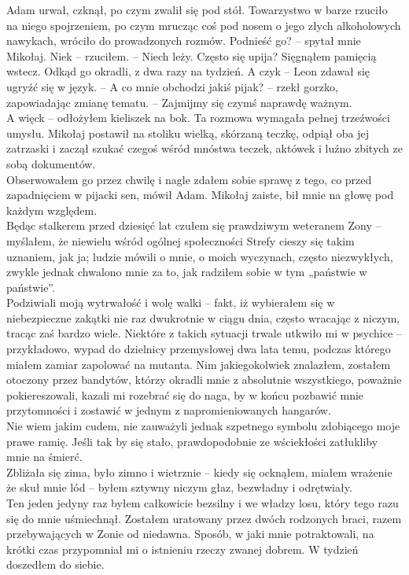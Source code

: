 \documentclass[../MAIN.tex]{subfiles}
\begin{document}
\qd
Adam urwał, czknął, po czym zwalił się pod stół. Towarzystwo w barze rzuciło na niego spojrzeniem, po czym mrucząc coś pod nosem o jego złych alkoholowych nawykach, wróciło do prowadzonych rozmów.
%
\sx Podnieść go? -- spytał mnie Mikołaj.
\xx Nie\3k -- rzuciłem. -- Niech leży.
\xx Często się upija?
\qd
Sięgnąłem pamięcią wstecz.
%
\sx Odkąd go okradli, z dwa razy na tydzień.
\xx A czy\3k -- Leon zdawał się ugryźć się w język. -- A co mnie obchodzi jakiś pijak? -- rzekł gorzko, zapowiadając zmianę tematu. -- Zajmijmy się czymś naprawdę ważnym.\\
\xx A więc\3k -- odłożyłem kieliszek na bok. Ta rozmowa wymagała pełnej trzeźwości umysłu.
\qd
%
Mikołaj postawił na stoliku wielką, skórzaną teczkę, odpiął oba jej zatrzaski i zaczął szukać czegoś wśród mnóstwa teczek, aktówek i luźno zbitych ze sobą dokumentów.\\
Obserwowałem go przez chwilę i nagle zdałem sobie sprawę z tego, co przed zapadnięciem w pijacki sen, mówił Adam. Mikołaj zaiste, bił mnie na głowę pod każdym względem.\\
Będąc stalkerem przed dziesięć lat czułem się prawdziwym weteranem Zony -- myślałem, że niewielu wśród ogólnej społeczności Strefy cieszy się takim uznaniem, jak ja; ludzie mówili o mnie, o moich wyczynach, często niezwykłych, zwykle jednak chwalono mnie za to, jak radziłem sobie w tym „państwie w państwie”.\\
Podziwiali moją wytrwałość i wolę walki -- fakt, iż wybierałem się w niebezpieczne zakątki nie raz dwukrotnie w ciągu dnia, często wracając z niczym, tracąc zaś bardzo wiele. Niektóre z takich sytuacji trwale utkwiło mi w psychice -- przykładowo, wypad do dzielnicy przemysłowej dwa lata temu, podczas którego miałem zamiar zapolować na mutanta. Nim jakiegokolwiek znalazłem, zostałem otoczony przez bandytów, którzy okradli mnie z absolutnie wszystkiego, poważnie pokiereszowali, kazali mi rozebrać się do naga, by w końcu pozbawić mnie przytomności i zostawić w jednym z napromieniowanych hangarów.\\
Nie wiem jakim cudem, nie zauważyli jednak szpetnego symbolu zdobiącego moje prawe ramię. Jeśli tak by się stało, prawdopodobnie ze wściekłości zatłukliby mnie na śmierć.\\
Zbliżała się zima, było zimno i wietrznie -- kiedy się ocknąłem, miałem wrażenie że skuł mnie lód -- byłem sztywny niczym głaz, bezwładny i odrętwiały.\\
Ten jeden jedyny raz byłem całkowicie bezsilny i we władzy losu, który tego razu się do mnie uśmiechnął. Zostałem uratowany przez dwóch rodzonych braci, razem przebywających w Zonie od niedawna. Sposób, w jaki mnie potraktowali, na krótki czas przypomniał mi o istnieniu rzeczy zwanej dobrem. W tydzień doszedłem do siebie.\\
\end{document}
